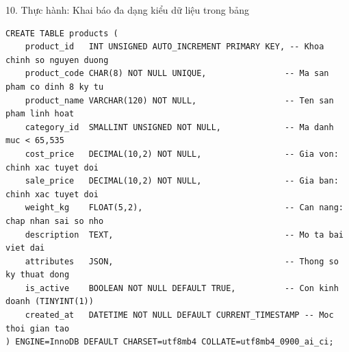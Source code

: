 \documentclass[aspectratio=169,11pt]{beamer}
\begin{document}
\begin{frame}[fragile]{10. Thực hành: Khai báo đa dạng kiểu dữ liệu trong bảng}
\begin{lstlisting}
CREATE TABLE products (
    product_id   INT UNSIGNED AUTO_INCREMENT PRIMARY KEY, -- Khoa chinh so nguyen duong
    product_code CHAR(8) NOT NULL UNIQUE,                -- Ma san pham co dinh 8 ky tu
    product_name VARCHAR(120) NOT NULL,                  -- Ten san pham linh hoat
    category_id  SMALLINT UNSIGNED NOT NULL,             -- Ma danh muc < 65,535
    cost_price   DECIMAL(10,2) NOT NULL,                 -- Gia von: chinh xac tuyet doi
    sale_price   DECIMAL(10,2) NOT NULL,                 -- Gia ban: chinh xac tuyet doi
    weight_kg    FLOAT(5,2),                             -- Can nang: chap nhan sai so nho
    description  TEXT,                                   -- Mo ta bai viet dai
    attributes   JSON,                                   -- Thong so ky thuat dong
    is_active    BOOLEAN NOT NULL DEFAULT TRUE,          -- Con kinh doanh (TINYINT(1))
    created_at   DATETIME NOT NULL DEFAULT CURRENT_TIMESTAMP -- Moc thoi gian tao
) ENGINE=InnoDB DEFAULT CHARSET=utf8mb4 COLLATE=utf8mb4_0900_ai_ci;
\end{lstlisting}
\end{frame}
\end{document}
